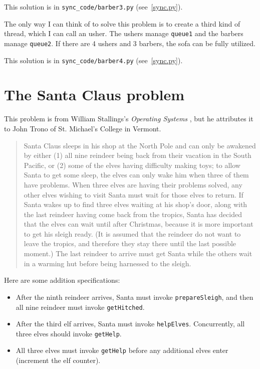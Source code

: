 \documentclass{book}
\newcommand{\clearemptydoublepage}{\newpage\cleardoublepage}
\begin{document}
This solution is in \verb"sync_code/barber3.py" (see~\ref{sync.py}).

The only way I can think of to solve this problem is to create a third
kind of thread, which I can call an usher.  The ushers manage {\tt queue1}
and the barbers manage {\tt queue2}.  If there are 4 ushers and 3 barbers,
the sofa can be fully utilized.

This solution is in \verb"sync_code/barber4.py" (see~\ref{sync.py}).


\clearemptydoublepage
\section{The Santa Claus problem}

This problem is from William Stallings's
{\em Operating Systems} \cite{stallings},
but he attributes it to John Trono of St. Michael's College in
Vermont.

\begin{quotation}
Santa Claus sleeps in his shop at the North Pole and can only be
awakened by either (1) all nine reindeer being back from their
vacation in the South Pacific, or (2) some of the elves having
difficulty making toys; to allow Santa to get some sleep, the elves
can only wake him when three of them have problems.  When three elves
are having their problems solved, any other elves wishing to visit
Santa must wait for those elves to return.  If Santa wakes up to find
three elves waiting at his shop's door, along with the last reindeer
having come back from the tropics, Santa has decided that the elves can
wait until after Christmas, because it is more important to get his
sleigh ready.  (It is assumed that the reindeer do not want to leave
the tropics, and therefore they stay there until the last possible
moment.)  The last reindeer to arrive must get Santa while the others
wait in a warming hut before being harnessed to the sleigh.
\end{quotation}

Here are some addition specifications:

\begin {itemize}

\item After the ninth reindeer arrives, Santa must invoke 
{\tt prepareSleigh}, and then all nine reindeer must
invoke {\tt getHitched}.

\item After the third elf arrives, Santa must invoke {\tt helpElves}.
Concurrently, all three elves should invoke {\tt getHelp}.

\item All three elves must invoke {\tt getHelp} before any additional
elves enter (increment the elf counter).

\end {itemize}
\end{document}
